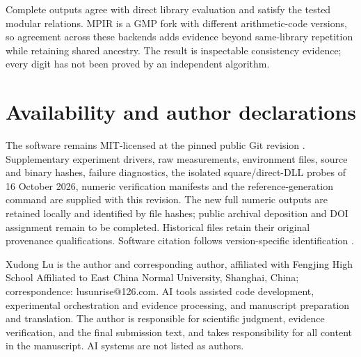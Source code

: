 \documentclass[11pt,a4paper]{article}
\begin{document}
Complete outputs agree with direct library evaluation and satisfy the tested modular relations. MPIR is a GMP fork with different arithmetic-code versions, so agreement across these backends adds evidence beyond same-library repetition while retaining shared ancestry. The result is inspectable consistency evidence; every digit has not been proved by an independent algorithm.

\section{Availability and author declarations}

The software remains MIT-licensed at the pinned public Git revision \cite{software}. Supplementary experiment drivers, raw measurements, environment files, source and binary hashes, failure diagnostics, the isolated square/direct-DLL probes of 16 October 2026, numeric verification manifests and the reference-generation command are supplied with this revision. The new full numeric outputs are retained locally and identified by file hashes; public archival deposition and DOI assignment remain to be completed. Historical files retain their original provenance qualifications. Software citation follows version-specific identification \cite{citation}.

Xudong Lu is the author and corresponding author, affiliated with Fengjing High School Affiliated to East China Normal University, Shanghai, China; correspondence: lusunrise@126.com. AI tools assisted code development, experimental orchestration and evidence processing, and manuscript preparation and translation. The author is responsible for scientific judgment, evidence verification, and the final submission text, and takes responsibility for all content in the manuscript. AI systems are not listed as authors.
\end{document}
